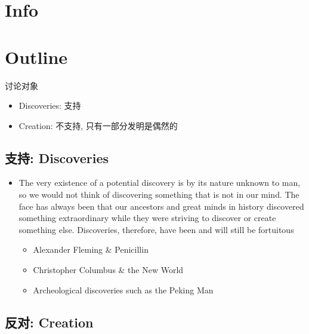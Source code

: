 \documentclass{article}
\begin{document}
  \section{Info}

  \section{Outline}

    讨论对象

    \begin{itemize}
      \item Discoveries: 支持
      \item Creation: 不支持, 只有一部分发明是偶然的
    \end{itemize}

    \subsection{支持: Discoveries}

      \begin{itemize}
        \item The very existence of a potential discovery is by its nature
        unknown to man, so we would not think of discovering something
        that is not in our mind. The face has always been that our ancestors
        and great minds in history discovered something extraordinary
        while they were striving to discover or create something else.
        Discoveries, therefore, have been and will still be fortuitous
        \begin{itemize}
          \item Alexander Fleming \& Penicillin
          \item Christopher Columbus \& the New World
          \item Archeological discoveries such as the Peking Man
        \end{itemize}
      \end{itemize}

    \subsection{反对: Creation}
\end{document}
